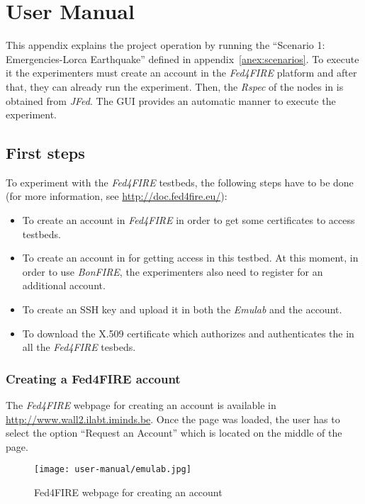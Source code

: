 \chapter{User Manual}

This appendix explains the project operation by running the ``Scenario 1:
Emergencies-Lorca Earthquake'' defined in appendix~\ref{anex:scenarios}. To
execute it the experimenters must create an account in the \emph{Fed4FIRE} platform
and after that, they can already run the experiment. Then, the \emph{Rspec} of the nodes in
\vw is obtained from \emph{JFed}. The \ac{GUI} provides an
automatic manner to execute the experiment.

\section{First steps}
\label{sec:first-steps}
To experiment with the \emph{Fed4FIRE} testbeds, the following steps have to be
done (for more information, see \url{http://doc.fed4fire.eu/}): 
\begin{itemize}
\item To create an account in \emph{Fed4FIRE} in order to get some certificates
  to access testbeds.
\item To create an account in \bonfire for getting access in this testbed. At
  this moment, in order to use \emph{BonFIRE}, the experimenters also need to register for an additional account. 
\item To create an \ac{SSH} key and upload it in both the \emph{Emulab} and the
  \bonfire account.
\item To download the X.509 certificate which authorizes and authenticates the
  in all the \emph{Fed4FIRE} tesbeds.
\end{itemize}

\subsection{Creating a Fed4FIRE account}

The \emph{Fed4FIRE} webpage for creating an account is available in
\url{http://www.wall2.ilabt.iminds.be}. Once the page was loaded, the user has
to select the option ``Request an Account'' which is located on the middle of the page.

\begin{figure}[!h]
\begin{center}
\texttt{[image: user-manual/emulab.jpg]}
\caption{Fed4FIRE webpage for creating an account}
\label{fig:fed4fire-account}
\end{center}
\end{figure}

